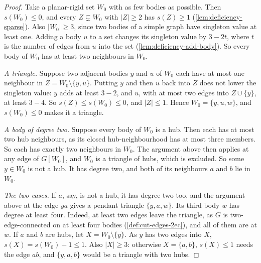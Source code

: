 \begin{proof}
  \leanok
  Take a planar-rigid set $W_0$ with as few bodies as possible. Then
  $s(W_0) \le 0$, and every $Z \subsetneq W_0$ with $|Z| \ge 2$ has
  $s(Z) \ge 1$ (\cref{lem:deficiency-sparse}). Also $|W_0| \ge 3$, since
  two bodies of a simple graph have singleton value at least one. Adding a
  body $u$ to a set changes its singleton value by $3 - 2t$, where $t$ is
  the number of edges from $u$ into the set
  (\cref{lem:deficiency-add-body}). So every body of $W_0$ has at least
  two neighbours in $W_0$.

  \emph{A triangle.} Suppose two adjacent bodies $y$ and $u$ of $W_0$ each
  have at most one neighbour in $Z = W_0 \setminus \{y, u\}$. Putting $y$
  and then $u$ back into $Z$ does not lower the singleton value: $y$ adds
  at least $3 - 2$, and $u$, with at most two edges into $Z \cup \{y\}$,
  at least $3 - 4$. So $s(Z) \le s(W_0) \le 0$, and $|Z| \le 1$. Hence
  $W_0 = \{y, u, w\}$, and $s(W_0) \le 0$ makes it a triangle.

  \emph{A body of degree two.} Suppose every body of $W_0$ is a hub. Then
  each has at most two hub neighbours, as its closed hub-neighbourhood has
  at most three members. So each has exactly two neighbours in $W_0$. The
  argument above then applies at any edge of $G[W_0]$, and $W_0$ is a
  triangle of hubs, which is excluded. So some $y \in W_0$ is not a hub.
  It has degree two, and both of its neighbours $a$ and $b$ lie in $W_0$.

  \emph{The two cases.} If $a$, say, is not a hub, it has degree two too,
  and the argument above at the edge $ya$ gives a pendant triangle
  $\{y, a, w\}$. Its third body $w$ has degree at least four. Indeed, at
  least two edges leave the triangle, as $G$ is two-edge-connected on at
  least four bodies (\cref{def:cut-edges-2ec}), and all of them are at
  $w$. If $a$ and $b$ are hubs, let $X = W_0 \setminus \{y\}$. As $y$ has
  two edges into $X$, $s(X) = s(W_0) + 1 \le 1$. Also $|X| \ge 3$:
  otherwise $X = \{a, b\}$, $s(X) \le 1$ needs the edge $ab$, and
  $\{y, a, b\}$ would be a triangle with two hubs.
\end{proof}
